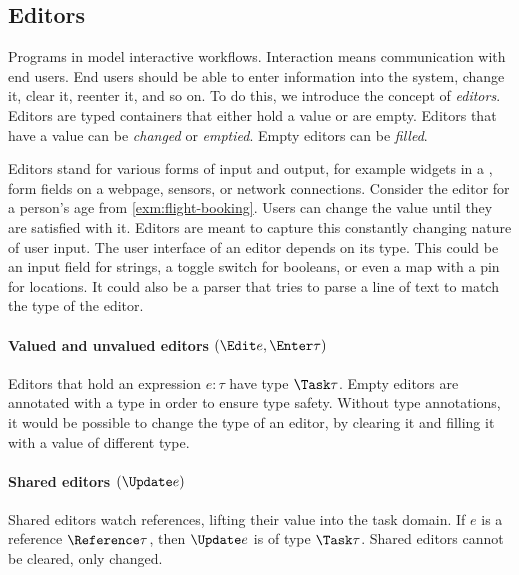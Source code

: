\subsection{Editors}

Programs in \TOPHAT model interactive workflows.
Interaction means communication with end users.
End users should be able to enter information into the system, change it, clear it, reenter it, and so on.
To do this, we introduce the concept of \emph{editors}.
%
Editors are typed containers that either hold a value or are empty.
Editors that have a value can be \emph{changed} or \emph{emptied}.
Empty editors can be \emph{filled}.


Editors stand for various forms of input and output, for example widgets in a \GUI, form fields on a webpage, sensors, or network connections.
%
Consider the editor for a person's age from \cref{exm:flight-booking}.
Users can change the value until they are satisfied with it.
Editors are meant to capture this constantly changing nature of user input.
%
The user interface of an editor depends on its type.
This could be an input field for strings, a toggle switch for booleans, or even a map with a pin for locations.
It could also be a parser that tries to parse a line of text to match the type of the editor.


\paragraph{Valued and unvalued editors $(\Edit e, \Enter \tau)$}

Editors that hold an expression $e : \tau$ have type $\Task \tau$.
Empty editors are annotated with a type in order to ensure type safety.
Without type annotations, it would be possible to change the type of an editor, by clearing it and filling it with a value of different type.

\paragraph{Shared editors $(\Update e)$}

Shared editors watch references, lifting their value into the task domain.
If $e$ is a reference $\Reference \tau$, then $\Update e$ is of type $\Task \tau$.
Shared editors cannot be cleared, only changed.

